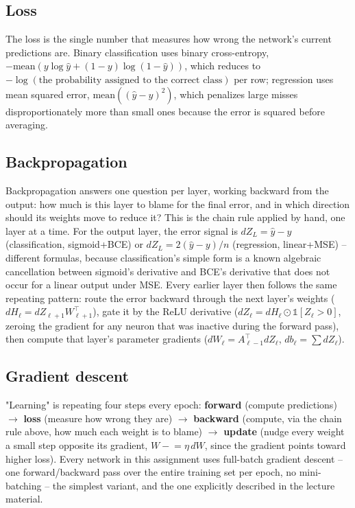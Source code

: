 \documentclass[11pt, a4paper]{article}
\begin{document}
\subsection{Loss}

The loss is the single number that measures how wrong the network's current predictions
are. Binary classification uses binary cross-entropy,
$-\text{mean}(y\log\hat{y} + (1-y)\log(1-\hat{y}))$, which reduces to
$-\log(\text{the probability assigned to the correct class})$ per row; regression uses mean
squared error, $\text{mean}((\hat{y}-y)^2)$, which penalizes large misses
disproportionately more than small ones because the error is squared before averaging.

\subsection{Backpropagation}

Backpropagation answers one question per layer, working backward from the output: how much
is this layer to blame for the final error, and in which direction should its weights move
to reduce it? This is the chain rule applied by hand, one layer at a time. For the output
layer, the error signal is $dZ_L = \hat{y} - y$ (classification, sigmoid+BCE) or
$dZ_L = 2(\hat{y}-y)/n$ (regression, linear+MSE) -- different formulas, because
classification's simple form is a known algebraic cancellation between sigmoid's derivative
and BCE's derivative that does not occur for a linear output under MSE. Every earlier layer
then follows the same repeating pattern: route the error backward through the next layer's
weights ($dH_{\ell} = dZ_{\ell+1} W_{\ell+1}^{\top}$), gate it by the ReLU derivative
($dZ_\ell = dH_\ell \odot \mathbb{1}[Z_\ell > 0]$, zeroing the gradient for any neuron that
was inactive during the forward pass), then compute that layer's parameter gradients
($dW_\ell = A_{\ell-1}^{\top} dZ_\ell$, $db_\ell = \sum dZ_\ell$).

\subsection{Gradient descent}

"Learning" is repeating four steps every epoch: \textbf{forward} (compute predictions)
$\to$ \textbf{loss} (measure how wrong they are) $\to$ \textbf{backward} (compute, via the
chain rule above, how much each weight is to blame) $\to$ \textbf{update} (nudge every
weight a small step opposite its gradient, $W \mathrel{-}= \eta \, dW$, since the gradient
points toward higher loss). Every network in this assignment uses full-batch gradient
descent -- one forward/backward pass over the entire training set per epoch, no
mini-batching -- the simplest variant, and the one explicitly described in the lecture
material.
\end{document}
